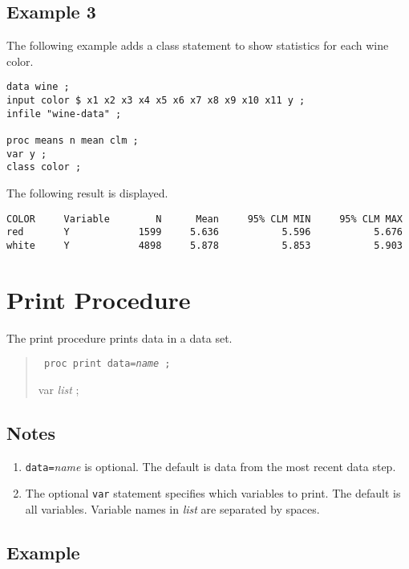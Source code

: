 \documentclass[12pt]{article}
\begin{document}
\subsection*{Example 3}

The following example adds a class statement
to show statistics for each wine color.

{\scriptsize\begin{verbatim}
data wine ;
input color $ x1 x2 x3 x4 x5 x6 x7 x8 x9 x10 x11 y ;
infile "wine-data" ;

proc means n mean clm ;
var y ;
class color ;
\end{verbatim}}

The following result is displayed.

{\scriptsize\begin{verbatim}
COLOR     Variable        N      Mean     95% CLM MIN     95% CLM MAX
red       Y            1599     5.636           5.596           5.676
white     Y            4898     5.878           5.853           5.903
\end{verbatim}}

\newpage

\section{Print Procedure}

The print procedure prints data in a data set.

\begin{quote}
{\tt
proc print data={\it name} ;

var {\it list} ;
}
\end{quote}

\subsection*{Notes}

\begin{enumerate}
\item
{\tt data=}{\it name} is optional.
The default is data from the most recent data step.
\item
The optional {\tt var} statement specifies which variables
to print.
The default is all variables.
Variable names in {\it list} are separated by spaces.
\end{enumerate}

\subsection*{Example}
\end{document}
